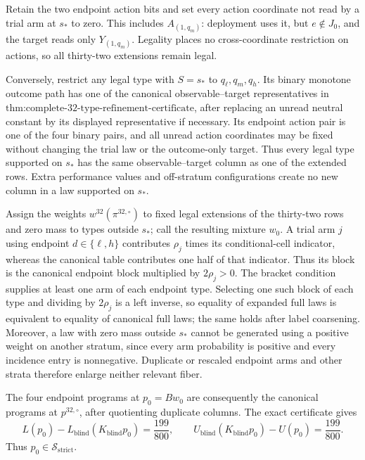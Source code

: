 Retain the two endpoint action bits and set every action coordinate not read by a trial arm at \(s_*\) to zero.  This includes \(A_{(1,q_m)}\): deployment uses it, but \(e\notin J_0\), and the target reads only \(Y_{(1,q_m)}\).  Legality places no cross-coordinate restriction on actions, so all thirty-two extensions remain legal.

Conversely, restrict any legal type with \(S=s_*\) to \(q_\ell,q_m,q_h\).  Its binary monotone outcome path has one of the canonical observable--target representatives in \(\text{thm:complete-32-type-refinement-certificate}\), after replacing an unread neutral constant by its displayed representative if necessary.  Its endpoint action pair is one of the four binary pairs, and all unread action coordinates may be fixed without changing the trial law or the outcome-only target.  Thus every legal type supported on \(s_*\) has the same observable--target column as one of the extended rows.  Extra performance values and off-stratum configurations create no new column in a law supported on \(s_*\).

Assign the weights \(w^{32}(\pi^{32,\circ})\) to fixed legal extensions of the thirty-two rows and zero mass to types outside \(s_*\); call the resulting mixture \(w_0\).  A trial arm \(j\) using endpoint \(d\in\{\ell,h\}\) contributes \(\rho_j\) times its conditional-cell indicator, whereas the canonical table contributes one half of that indicator.  Thus its block is the canonical endpoint block multiplied by \(2\rho_j>0\).  The bracket condition supplies at least one arm of each endpoint type.  Selecting one such block of each type and dividing by \(2\rho_j\) is a left inverse, so equality of expanded full laws is equivalent to equality of canonical full laws; the same holds after label coarsening.  Moreover, a law with zero mass outside \(s_*\) cannot be generated using a positive weight on another stratum, since every arm probability is positive and every incidence entry is nonnegative.  Duplicate or rescaled endpoint arms and other strata therefore enlarge neither relevant fiber.

The four endpoint programs at \(p_0=Bw_0\) are consequently the canonical programs at \(p^{32,\circ}\), after quotienting duplicate columns.  The exact certificate gives
\[
L(p_0)-L_{\mathrm{blind}}(K_{\mathrm{blind}}p_0)=\frac{199}{800},
\qquad
U_{\mathrm{blind}}(K_{\mathrm{blind}}p_0)-U(p_0)=\frac{199}{800}.
\tag{9}
\]
Thus \(p_0\in\mathcal S_{\mathrm{strict}}\).

